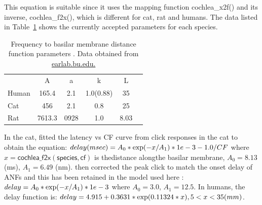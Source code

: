 \medskip{}

This equation is suitable since it uses the mapping function
\mbox{\textsf{cochlea\_x2f()}} and its inverse, \mbox{\textsf{cochlea\_f2x()}},
which is different for cat, rat and humans.  The data listed in
Table~\ref{tab:f2x} shows the currently accepted parameters for each species.


\begin{table}[h]
  \centering
  \begin{tabular}{lccccc}
\hline
      &   A   &   a  &     k     & L \\
Human & 165.4 &  2.1 & 1.0(0.88) & 35\\
 Cat  &  456  &  2.1 &    0.8    & 25 \\
 Rat  & 7613.3& 0928 &    1.0    & 8.03 \\
\hline
\end{tabular}
  \caption{Frequency to basilar membrane distance function parameters \citep{FitzGeraldBurkittEtAl:2001}. Data obtained from \url{earlab.bu.edu.}}\label{tab:f2x}
\end{table}


In the cat, \citet{CarneyYin:1988} fitted the latency vs CF curve from click
responses in the cat to obtain the equation: \( delay (msec) = A_0 * {\rm exp}(
-x / A_1 ) * 1e-3 - 1.0/CF \) where $x = \mathsf{cochlea\_f2x(species, cf)}$ is
thedistance alongthe basilar membrane, $A_0 = 8.13$ (ms), $A_1 = 6.49$
(nm). \citet{HeinzZhangEtAl:2001} then corrected the peak click to match the
onset delay of ANFs and this has been retained in the model used here
\citep{ZilanyBruceEtAl:2009}: \(delay = A_0 * {\rm exp}(-x / A_1) * 1e-3 \)
where $A_0 = 3.0$, $A_1 = 12.5$. In humans, the delay function is: \( delay =
4.915 + 0.3631 * {\rm exp}(0.11324*x) , 5<x<35 (mm) \).

\medskip{}

